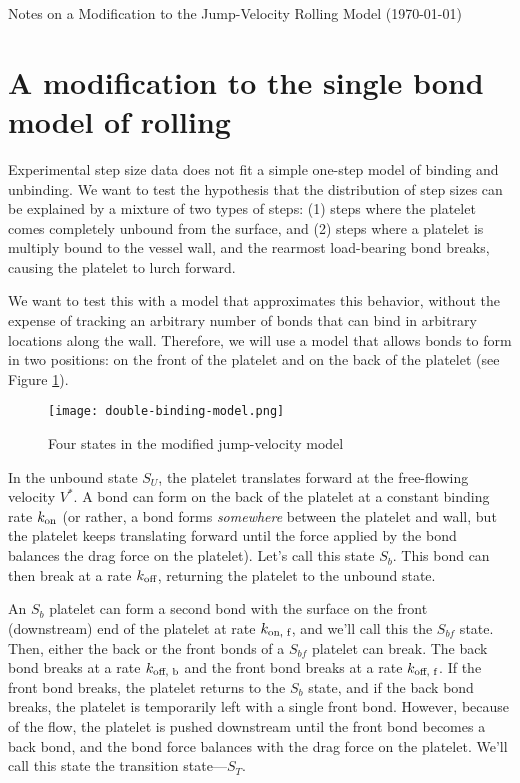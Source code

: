 \documentclass{article}
\newcommand{\tn}{\textnormal}
\begin{document}
\pagestyle{plain}

\begin{center}
  {\Large Notes on a Modification to the Jump-Velocity Rolling Model
    (\today)}
\end{center}

\section{A modification to the single bond model of rolling}
\label{sec:modif-single-bond}

Experimental step size data does not fit a simple one-step model of
binding and unbinding. We want to test the hypothesis that the
distribution of step sizes can be explained by a mixture of two types
of steps: (1) steps where the platelet comes completely unbound from
the surface, and (2) steps where a platelet is multiply bound to the
vessel wall, and the rearmost load-bearing bond breaks, causing the
platelet to lurch forward.

We want to test this with a model that approximates this behavior,
without the expense of tracking an arbitrary number of bonds that can
bind in arbitrary locations along the wall. Therefore, we will use a
model that allows bonds to form in two positions: on the front of the
platelet and on the back of the platelet (see Figure
\ref{fig:four-states}).

\begin{figure}
  \centering
  \texttt{[image: double-binding-model.png]}
  \caption{Four states in the modified jump-velocity model}
  \label{fig:four-states}
\end{figure}

In the unbound state $S_U$, the platelet translates forward at the
free-flowing velocity $V^*$. A bond can form on the back of the
platelet at a constant binding rate $k_\tn{on}$ (or rather, a bond
forms \emph{somewhere} between the platelet and wall, but the platelet
keeps translating forward until the force applied by the bond balances
the drag force on the platelet). Let's call this state $S_b$. This
bond can then break at a rate $k_\tn{off}$, returning the platelet to
the unbound state.

An $S_b$ platelet can form a second bond with the surface on the front
(downstream) end of the platelet at rate $k_\tn{on, f}$, and we'll
call this the $S_{bf}$ state. Then, either the back or the front bonds
of a $S_{bf}$ platelet can break. The back bond breaks at a rate
$k_\tn{off, b}$ and the front bond breaks at a rate $k_\tn{off,
  f}$. If the front bond breaks, the platelet returns to the $S_b$
state, and if the back bond breaks, the platelet is temporarily left
with a single front bond. However, because of the flow, the platelet
is pushed downstream until the front bond becomes a back bond, and the
bond force balances with the drag force on the platelet. We'll call
this state the transition state---$S_T$.
\end{document}
